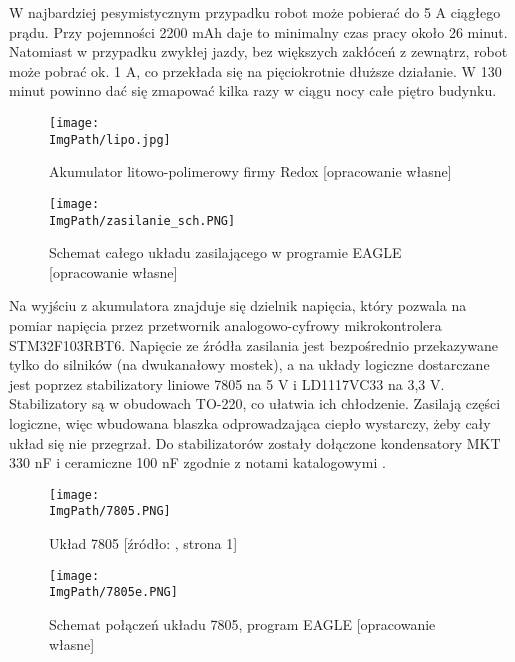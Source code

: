 \documentclass[a4paper,12pt,twoside,openany]{report}
\newcommand{\ImgPath}{.}
\begin{document}
W najbardziej pesymistycznym przypadku robot może pobierać do 5 A ciągłego prądu. Przy pojemności 2200 mAh daje to minimalny czas pracy około 26 minut. Natomiast w przypadku zwykłej jazdy, bez większych zakłóceń z zewnątrz, robot może pobrać ok. 1 A, co przekłada się na pięciokrotnie dłuższe działanie. W 130 minut powinno dać się zmapować kilka razy w ciągu nocy całe piętro budynku.

\begin{figure}[!htbp]
	\begin{center}
\centering
\texttt{[image: \\ImgPath/lipo.jpg]}
\end{center}
	\caption{Akumulator litowo-polimerowy firmy Redox [opracowanie własne]}
	\label{schematKomunikacji}
\end{figure}

\newpage

\begin{figure}[!htbp]
	\begin{center}
\centering
\texttt{[image: \\ImgPath/zasilanie\_sch.PNG]}
\end{center}
	\caption{Schemat całego układu zasilającego w programie EAGLE [opracowanie własne]}
	\label{schematKomunikacji}
\end{figure}

Na wyjściu z akumulatora znajduje się dzielnik napięcia, który pozwala na pomiar napięcia przez przetwornik analogowo-cyfrowy mikrokontrolera STM32F103RBT6. Napięcie ze źródła zasilania jest bezpośrednio przekazywane tylko do silników (na dwukanałowy mostek), a na układy logiczne dostarczane jest poprzez stabilizatory liniowe 7805 na 5 V i LD1117VC33 na 3,3 V. Stabilizatory są w obudowach TO-220, co ułatwia ich chłodzenie. Zasilają części logiczne, więc wbudowana blaszka odprowadzająca ciepło wystarczy, żeby cały układ się nie przegrzał. Do stabilizatorów zostały dołączone kondensatory MKT 330 nF i ceramiczne 100 nF zgodnie z notami katalogowymi \cite{7805,LD1117}.

\begin{figure}[!htbp]
	\begin{center}
\centering
\texttt{[image: \\ImgPath/7805.PNG]}
\end{center}
	\caption{Układ 7805 [źródło: \cite{7805}, strona 1]}
	\label{schematKomunikacji}
\end{figure}
\newpage
\begin{figure}[!htbp]
	\begin{center}
\centering
\texttt{[image: \\ImgPath/7805e.PNG]}
\end{center}
	\caption{Schemat połączeń układu 7805, program EAGLE [opracowanie własne]}
	\label{schematKomunikacji}
\end{figure}
\end{document}
